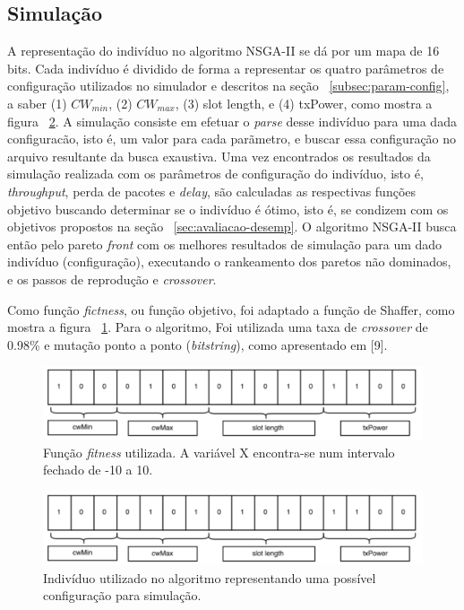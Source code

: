 \documentclass[conference]{IEEEtran}
\begin{document}
\subsection{Simulação}

A representação do indivíduo no algoritmo NSGA-II se dá por um mapa de 16 bits.  Cada indivíduo é dividido de forma a representar os quatro parâmetros de configuração utilizados no simulador e descritos na seção ~\ref{subsec:param-config}, a saber (1) $CW_{min}$, (2) $CW_{max}$, (3) slot length, e (4) txPower, como mostra a figura ~\ref{fig:bits-config}.  A simulação consiste em efetuar o \textit{parse} desse indivíduo para uma dada configuracão, isto é, um valor para cada parãmetro, e buscar essa configuração no arquivo resultante da busca exaustiva. Uma vez encontrados os resultados da simulação realizada com os parâmetros de configuração do indivíduo,
isto é, \textit{throughput}, perda de pacotes e \textit{delay}, são calculadas as respectivas funções objetivo buscando determinar se o indivíduo é ótimo, isto é, se condizem com os objetivos propostos na seção ~\ref{sec:avaliacao-desemp}. O algoritmo NSGA-II busca então pelo pareto \textit{front} com os melhores resultados de simulação para um dado indivíduo (configuração), executando o rankeamento dos paretos não dominados, e os passos de reprodução e \textit{crossover}.

Como função \textit{fictness}, ou função objetivo, foi adaptado a função de Shaffer, como mostra a figura ~\ref{fig:function}.
Para o algoritmo, Foi utilizada uma taxa de \textit{crossover} de 0.98\% e mutação ponto a ponto (\textit{bitstring}), como apresentado em [9].

\begin{figure}[t]
  \centering
  \includegraphics[scale=0.26]{figures/bits-config.png}
  \caption{Função \textit{fitness} utilizada. A variável X encontra-se num intervalo fechado de -10 a 10.}
  \label{fig:function}
\end{figure}


\begin{figure}[t]
  \centering
  \includegraphics[scale=0.26]{figures/bits-config.png}
  \caption{Indivíduo utilizado no algoritmo representando uma possível configuração para simulação.}
  \label{fig:bits-config}
\end{figure}
\end{document}

